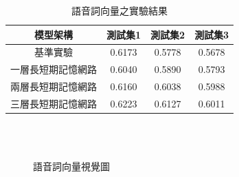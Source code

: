 \begin{table}[ht]
	 \centering
	 \caption{語音詞向量之實驗結果}
	 \label{table:ch5_a2v}
	 \begin{tabular}{|c|c|c|c|}
		 \hline
		 模型架構 & 測試集1 & 測試集2 & 測試集3 \\
		 \hline
		 基準實驗 & 0.6173 & 0.5778 & 0.5678\\
		 \hline
		 一層長短期記憶網路& 0.6040 & 0.5890 & 0.5793 \\
		 \hline
		 兩層長短期記憶網路& 0.6160 &0.6038 &0.5988\\
		 \hline
		 三層長短期記憶網路& {\color{red}0.6223} &0.6127 &0.6011\\
		 \hline
	   \end{tabular}
\end{table}


\begin{figure}
\centering
{}
\\
\\
\caption{語音詞向量視覺圖}
\label{fig:ch5_vis}
\end{figure}


